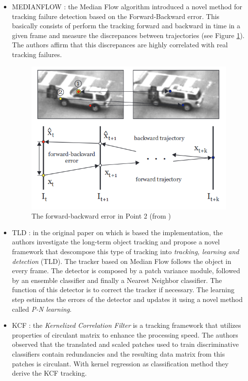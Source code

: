 \begin{itemize}
\item MEDIANFLOW \cite{kalal2010forward}: the Median Flow algorithm introduced a novel method for tracking failure detection based on the Forward-Backward error. This  basically consists of perform the tracking forward and backward in time in a given frame and measure the discrepances between trajectories (see Figure \ref{fig:medianflow}). The authors affirm that this discrepances are highly correlated with real tracking failures.
\begin{figure}[H]
\begin{center}
\includegraphics[scale=0.4]{figures/medianflow.png}
\caption{The forward-backward error in Point 2 (from \cite{kalal2010forward})}
\label{fig:medianflow}
\end{center}
\end{figure}    
\item TLD \cite{kalal2011tracking}: in the original paper on which is based the implementation, the authors investigate the long-term object tracking and propose a novel framework that descompose this type of tracking into \textit{tracking, learning and detection} (TLD). The tracker based on Median Flow follows the object in every frame. The detector is composed by a patch variance module, followed by an ensemble classifier and finally a Nearest Neighbor classifier. The function of this detector is to correct the tracker if necessary. The learning step estimates the errors of the detector and updates it using a novel method called \textit{P-N learning}.
\item KCF \cite{henriques2012exploiting}: the \textit{Kernelized Correlation Filter} is a tracking framework that utilizes properties of circulant matrix to enhance the processing speed. The authors observed that the translated and scaled patches used to train discriminative classifiers contain redundancies and the resulting data matrix from this patches is circulant. With kernel regression as classification method they derive the KCF tracking.

\end{itemize}
